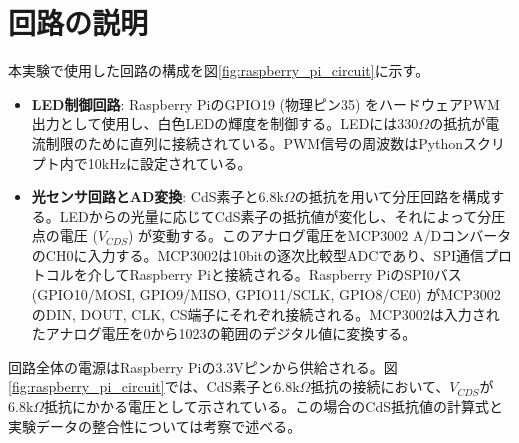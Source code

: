 \documentclass[a4paper,11pt,dvipdfmx]{jsarticle}
\begin{document}
\section{回路の説明}
本実験で使用した回路の構成を図\ref{fig:raspberry_pi_circuit}に示す。
\begin{itemize}
    \item \textbf{LED制御回路}: Raspberry PiのGPIO19 (物理ピン35) をハードウェアPWM出力として使用し、白色LEDの輝度を制御する。LEDには330$\Omega$の抵抗が電流制限のために直列に接続されている。PWM信号の周波数はPythonスクリプト内で10kHzに設定されている。
    \item \textbf{光センサ回路とAD変換}: CdS素子と6.8k$\Omega$の抵抗を用いて分圧回路を構成する。LEDからの光量に応じてCdS素子の抵抗値が変化し、それによって分圧点の電圧 ($V_{CDS}$) が変動する。このアナログ電圧をMCP3002 A/DコンバータのCH0に入力する。MCP3002は10bitの逐次比較型ADCであり、SPI通信プロトコルを介してRaspberry Piと接続される。Raspberry PiのSPI0バス (GPIO10/MOSI, GPIO9/MISO, GPIO11/SCLK, GPIO8/CE0) がMCP3002のDIN, DOUT, CLK, CS端子にそれぞれ接続される。MCP3002は入力されたアナログ電圧を0から1023の範囲のデジタル値に変換する。
\end{itemize}
回路全体の電源はRaspberry Piの3.3Vピンから供給される。図\ref{fig:raspberry_pi_circuit}では、CdS素子と6.8k$\Omega$抵抗の接続において、$V_{CDS}$が6.8k$\Omega$抵抗にかかる電圧として示されている。この場合のCdS抵抗値の計算式と実験データの整合性については考察で述べる。
\end{document}
